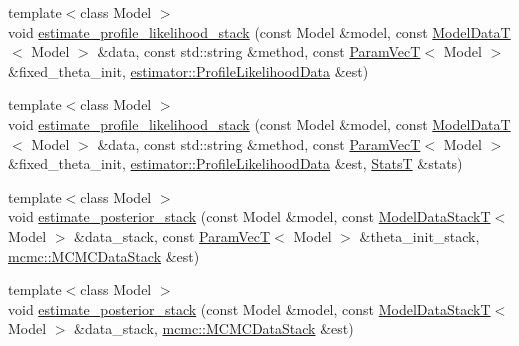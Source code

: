 \begin{DoxyCompactItemize}
\item 
{\footnotesize template$<$class Model $>$ }\\void \hyperlink{namespacemappel_1_1methods_1_1openmp_adaca1fbf3ed4990eee89a7721cfa5666}{estimate\+\_\+profile\+\_\+likelihood\+\_\+stack} (const Model \&model, const \hyperlink{namespacemappel_a97f050df953605381ae9c901c3b125f1}{Model\+DataT}$<$ Model $>$ \&data, const std\+::string \&method, const \hyperlink{namespacemappel_a0f86d3153e4e27b095012f140eea58de}{Param\+VecT}$<$ Model $>$ \&fixed\+\_\+theta\+\_\+init, \hyperlink{namespacemappel_1_1estimator_structmappel_1_1estimator_1_1ProfileLikelihoodData}{estimator\+::\+Profile\+Likelihood\+Data} \&est)
\item 
{\footnotesize template$<$class Model $>$ }\\void \hyperlink{namespacemappel_1_1methods_1_1openmp_a5e8898ef99b03faec55c9165b96ecb30}{estimate\+\_\+profile\+\_\+likelihood\+\_\+stack} (const Model \&model, const \hyperlink{namespacemappel_a97f050df953605381ae9c901c3b125f1}{Model\+DataT}$<$ Model $>$ \&data, const std\+::string \&method, const \hyperlink{namespacemappel_a0f86d3153e4e27b095012f140eea58de}{Param\+VecT}$<$ Model $>$ \&fixed\+\_\+theta\+\_\+init, \hyperlink{namespacemappel_1_1estimator_structmappel_1_1estimator_1_1ProfileLikelihoodData}{estimator\+::\+Profile\+Likelihood\+Data} \&est, \hyperlink{namespacemappel_a04ab395b0cf82c4ce68a36b2212649a5}{StatsT} \&stats)
\item 
{\footnotesize template$<$class Model $>$ }\\void \hyperlink{namespacemappel_1_1methods_1_1openmp_ae2fe47dafd5e1d2ca73fbc24ba34c4ff}{estimate\+\_\+posterior\+\_\+stack} (const Model \&model, const \hyperlink{namespacemappel_aaeb6665bc57476dd93c2df6ad8bc4768}{Model\+Data\+StackT}$<$ Model $>$ \&data\+\_\+stack, const \hyperlink{namespacemappel_a0f86d3153e4e27b095012f140eea58de}{Param\+VecT}$<$ Model $>$ \&theta\+\_\+init\+\_\+stack, \hyperlink{structmappel_1_1mcmc_1_1MCMCDataStack}{mcmc\+::\+M\+C\+M\+C\+Data\+Stack} \&est)
\item 
{\footnotesize template$<$class Model $>$ }\\void \hyperlink{namespacemappel_1_1methods_1_1openmp_a86a4ec8918ed62a8f0665a6fc1885ab9}{estimate\+\_\+posterior\+\_\+stack} (const Model \&model, const \hyperlink{namespacemappel_aaeb6665bc57476dd93c2df6ad8bc4768}{Model\+Data\+StackT}$<$ Model $>$ \&data\+\_\+stack, \hyperlink{structmappel_1_1mcmc_1_1MCMCDataStack}{mcmc\+::\+M\+C\+M\+C\+Data\+Stack} \&est)
\item 

\end{DoxyCompactItemize}
